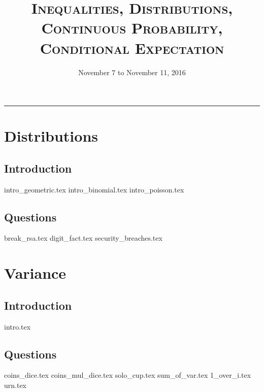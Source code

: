 \documentclass{exam}
\title{\textsc{Inequalities, Distributions, Continuous Probability, Conditional Expectation}}
\date{November 7 to November 11, 2016}
\begin{document}
\maketitle
\rule{\textwidth}{0.15em}
\fontsize{12}{15}\selectfont
\thispagestyle{empty}

\section{Distributions}
\subsection{Introduction}
{intro_geometric.tex}
{intro_binomial.tex}
{intro_poisson.tex}
\subsection{Questions}
\begin{questions}
	{break_rsa.tex}
	\clearpage
	{digit_fact.tex}
	{security_breaches.tex}
\end{questions}

\section{Variance}
\subsection{Introduction}
{intro.tex}
\subsection{Questions}
\begin{questions}
	{coins_dice.tex}
	{coins_mul_dice.tex}
	{solo_cup.tex}
	\clearpage
	{sum_of_var.tex}
	{1_over_i.tex}
	{urn.tex}
\end{questions}
\end{document}
